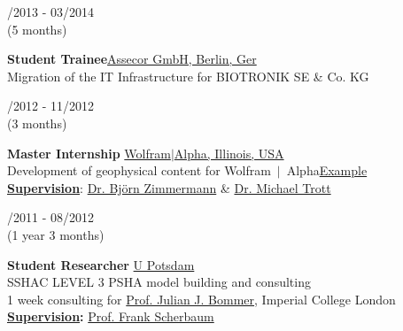 \documentclass{article}
\newcommand{\spacingWork}{0.25cm}
\begin{document}
\begin{minipage}[t]{0.69\textwidth}
\begin{minipage}[t]{0.99\textwidth}
		\vspace{\spacingWork}

		\begin{minipage}[t]{0.2\textwidth}
			/2013 - 03/2014 \\(5 months)
		\end{minipage}
		\hfill
		\begin{minipage}[t]{0.75\textwidth}
			\textbf{Student Trainee}\hfill \href{https://assecor.de/}{\color{pblue}Assecor GmbH, Berlin, Ger}\\
			Migration of the IT Infrastructure for BIOTRONIK SE \& Co. KG
		\end{minipage}
		
		\vspace{\spacingWork}
		
				\begin{minipage}[t]{0.2\textwidth}
				/2012 - 11/2012 \\(3 months)
				\end{minipage}
				\hfill
				\begin{minipage}[t]{0.75\textwidth}
				\textbf{Master Internship}\hfill	
				\href{https:///www.wolframalpha.com/}{\color{pblue}Wolfram$\mid$Alpha, Illinois, USA}\\
				Development of geophysical content for Wolfram$~\mid~$Alpha\hfill \href{https://m.wolframalpha.com/input/?i=moment+magnitude}{\color{pblue}Example}\\
				\textbf{\underline{Supervision}}: \href{mailto:bjornz@wolfram.com }{\color{pblue}Dr. Björn Zimmermann} \&	\href{mailto:mtrott@wolfram.com }{\color{pblue} Dr. Michael Trott}
				\end{minipage}
				
		\vspace{\spacingWork}
		
				\begin{minipage}[t]{0.2\textwidth}
				/2011 - 08/2012 \\(1 year 3 months)
				\end{minipage}
				\hfill
				\begin{minipage}[t]{0.75\textwidth}
				\textbf{Student Researcher}\hfill		
				\href{https://www.uni-potsdam.de/}{\color{pblue}U Potsdam}\\
				SSHAC LEVEL 3 PSHA model building and consulting\\
				1 week consulting for \href{https://www.imperial.ac.uk/people/j.bommer}{\color{pblue}Prof. Julian J. Bommer}, Imperial College London\\
				\textbf{\underline{Supervision}:} \href{http://www.geo.uni-potsdam.de/mitarbeiterdetails/show/96/Frank_Scherbaum.html/}{\color{pblue}Prof. Frank Scherbaum}				
				\end{minipage}
				

\end{minipage}
\end{minipage}
\end{document}
